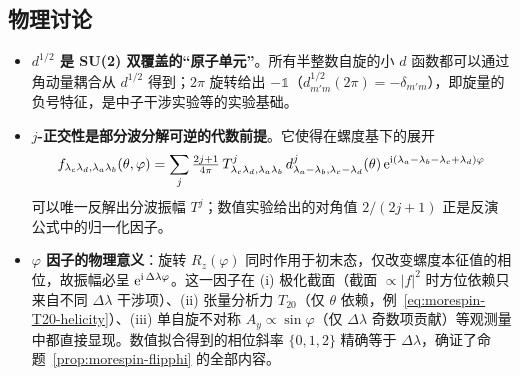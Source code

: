 \subsection*{物理讨论}
\begin{itemize}
    \item \textbf{$d^{1/2}$ 是 SU(2) 双覆盖的“原子单元”}。所有半整数自旋的小 $d$ 函数都可以通过角动量耦合从 $d^{1/2}$ 得到；$2\pi$ 旋转给出 $-\mathbb{1}$（$d^{1/2}_{m'm}(2\pi)=-\delta_{m'm}$），即旋量的负号特征，是中子干涉实验等的实验基础。
    \item \textbf{$j$-正交性是部分波分解可逆的代数前提}。它使得在螺度基下的展开
    \[
        f_{\lambda_c\lambda_d,\lambda_a\lambda_b}(\theta,\varphi)=\sum_{j}\tfrac{2j+1}{4\pi}\,T^j_{\lambda_c\lambda_d,\lambda_a\lambda_b}\,d^j_{\lambda_a-\lambda_b,\lambda_c-\lambda_d}(\theta)\,\mathrm{e}^{\mathrm{i}(\lambda_a-\lambda_b-\lambda_c+\lambda_d)\varphi}
    \]
    可以唯一反解出分波振幅 $T^j$；数值实验给出的对角值 $2/(2j+1)$ 正是反演公式中的归一化因子。
    \item \textbf{$\varphi$ 因子的物理意义}：旋转 $R_z(\varphi)$ 同时作用于初末态，仅改变螺度本征值的相位，故振幅必呈 $\mathrm{e}^{\mathrm{i}\,\Delta\lambda\varphi}$。这一因子在 (i) 极化截面（截面 $\propto |f|^2$ 时方位依赖只来自不同 $\Delta\lambda$ 干涉项）、(ii) 张量分析力 $T_{20}$（仅 $\theta$ 依赖，例~\ref{eq:morespin-T20-helicity}）、(iii) 单自旋不对称 $A_y\propto\sin\varphi$（仅 $\Delta\lambda$ 奇数项贡献）等观测量中都直接显现。数值拟合得到的相位斜率 $\{0,1,2\}$ 精确等于 $\Delta\lambda$，确证了命题~\ref{prop:morespin-flipphi} 的全部内容。
\end{itemize}
